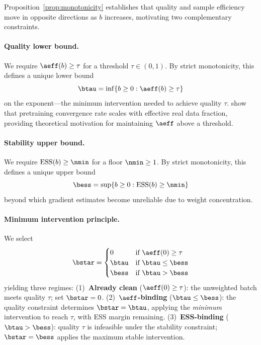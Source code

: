 Proposition~\ref{prop:monotonicity} establishes that quality and sample efficiency move in opposite directions as $b$ increases, motivating two complementary constraints.

\paragraph{Quality lower bound.}
We require $\aeff(b) \geq \tau$ for a threshold $\tau \in (0, 1)$.
By strict monotonicity, this defines a unique lower bound
\begin{equation}
  \btau = \inf\{b \geq 0 : \aeff(b) \geq \tau\}
  \label{eq:b_tau}
\end{equation}
on the exponent---the minimum intervention needed to achieve quality $\tau$.
\citet{wang_2026_survive_contamination} show that pretraining convergence rate scales with effective real data fraction, providing theoretical motivation for maintaining $\aeff$ above a threshold.

\paragraph{Stability upper bound.}
We require $\mathrm{ESS}(b) \geq \nmin$ for a floor $\nmin \geq 1$.
By strict monotonicity, this defines a unique upper bound
\begin{equation}
  \bess = \sup\{b \geq 0 : \mathrm{ESS}(b) \geq \nmin\}
  \label{eq:b_ess}
\end{equation}
beyond which gradient estimates become unreliable due to weight concentration.

\paragraph{Minimum intervention principle.}
We select
\begin{equation}
  \bstar = \begin{cases}
    0 & \text{if } \aeff(0) \geq \tau \\
    \btau & \text{if } \btau \leq \bess \\
    \bess & \text{if } \btau > \bess
  \end{cases}
  \label{eq:bstar}
\end{equation}
yielding three regimes:
(1)~\textbf{Already clean} ($\aeff(0) \geq \tau$): the unweighted batch meets quality $\tau$; set $\bstar = 0$.
(2)~\textbf{$\aeff$-binding} ($\btau \leq \bess$): the quality constraint determines $\bstar = \btau$, applying the \emph{minimum} intervention to reach $\tau$, with ESS margin remaining.
(3)~\textbf{ESS-binding} ($\btau > \bess$): quality $\tau$ is infeasible under the stability constraint; $\bstar = \bess$ applies the maximum stable intervention.

